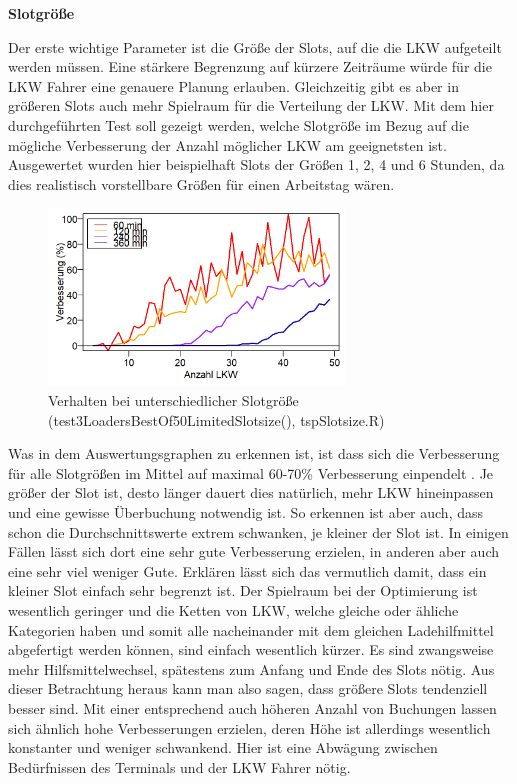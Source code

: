 \textbf{Slotgröße}


Der erste wichtige Parameter ist die Größe der Slots, auf die die LKW aufgeteilt werden müssen. Eine stärkere Begrenzung auf kürzere Zeiträume würde für die LKW Fahrer eine genauere Planung erlauben. Gleichzeitig gibt es aber in größeren Slots auch mehr Spielraum für die Verteilung der LKW. Mit dem hier durchgeführten Test soll gezeigt werden, welche Slotgröße im Bezug auf die mögliche Verbesserung der Anzahl möglicher LKW am geeignetsten ist. Ausgewertet wurden hier beispielhaft Slots der Größen 1, 2, 4 und 6 Stunden, da dies realistisch vorstellbare Größen für einen Arbeitstag wären.

\begin{figure}[H]
    \centering
    \includegraphics[width=0.7\textwidth]{images/graphs/tspSimALimSlotsize.png}
    \caption{Verhalten bei unterschiedlicher Slotgröße (test3LoadersBestOf50LimitedSlotsize(), tspSlotsize.R)}
    \label{fig:tspEvalSlotsize}
\end{figure}


Was in dem Auswertungsgraphen zu erkennen ist, ist dass sich die Verbesserung für alle Slotgrößen im Mittel auf maximal 60-70\% Verbesserung einpendelt . Je größer der Slot ist, desto länger dauert dies natürlich, mehr LKW hineinpassen und eine gewisse Überbuchung notwendig ist. So erkennen ist aber auch, dass schon die Durchschnittswerte extrem schwanken, je kleiner der Slot ist. In einigen Fällen lässt sich dort eine sehr gute Verbesserung erzielen, in anderen aber auch eine sehr viel weniger Gute. Erklären lässt sich das vermutlich damit, dass ein kleiner Slot einfach sehr begrenzt ist. Der Spielraum bei der Optimierung ist wesentlich geringer und die \glqq{}Ketten\grqq{} von LKW, welche gleiche oder ähliche Kategorien haben und somit alle nacheinander mit dem gleichen Ladehilfmittel abgefertigt werden können, sind einfach wesentlich kürzer. Es sind zwangsweise mehr Hilfsmittelwechsel, spätestens zum Anfang und Ende des Slots nötig. Aus dieser Betrachtung heraus kann man also sagen, dass größere Slots tendenziell besser sind. Mit einer entsprechend auch höheren Anzahl von Buchungen lassen sich ähnlich hohe Verbesserungen erzielen, deren Höhe ist allerdings wesentlich konstanter und weniger schwankend. Hier ist eine Abwägung zwischen Bedürfnissen des Terminals und der LKW Fahrer nötig.


